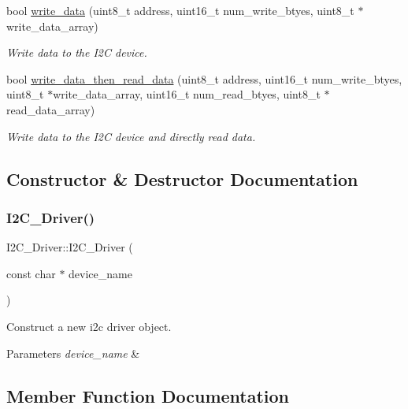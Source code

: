\begin{DoxyCompactItemize}
bool \hyperlink{class_i2_c___driver_ad1e1489f831a8b2d30d6a52682d82c7a}{write\+\_\+data} (uint8\+\_\+t address, uint16\+\_\+t num\+\_\+write\+\_\+btyes, uint8\+\_\+t $\ast$write\+\_\+data\+\_\+array)
\begin{DoxyCompactList}\small\item\em Write data to the I2C device. \end{DoxyCompactList}\item 
bool \hyperlink{class_i2_c___driver_a6cb254ccf0ceea35865722a7de8a698d}{write\+\_\+data\+\_\+then\+\_\+read\+\_\+data} (uint8\+\_\+t address, uint16\+\_\+t num\+\_\+write\+\_\+btyes, uint8\+\_\+t $\ast$write\+\_\+data\+\_\+array, uint16\+\_\+t num\+\_\+read\+\_\+btyes, uint8\+\_\+t $\ast$read\+\_\+data\+\_\+array)
\begin{DoxyCompactList}\small\item\em Write data to the I2C device and directly read data. \end{DoxyCompactList}\end{DoxyCompactItemize}


\subsection{Constructor \& Destructor Documentation}
\mbox{\label{class_i2_c___driver_a3e382db3517edc75227f540c872f93c8}} 
\subsubsection{\texorpdfstring{I2\+C\+\_\+\+Driver()}{I2C\_Driver()}}
{\footnotesize\ttfamily I2\+C\+\_\+\+Driver\+::\+I2\+C\+\_\+\+Driver (\begin{DoxyParamCaption}\item[{const char $\ast$}]{device\+\_\+name }\end{DoxyParamCaption})}



Construct a new i2c driver object. 


\begin{DoxyParams}{Parameters}
{\em device\+\_\+name} & \\
\hline
\end{DoxyParams}


\subsection{Member Function Documentation}
\mbox{\label{class_i2_c___driver_a6c9c95df6e1d6bbe7feee6eb506202ed}} 
